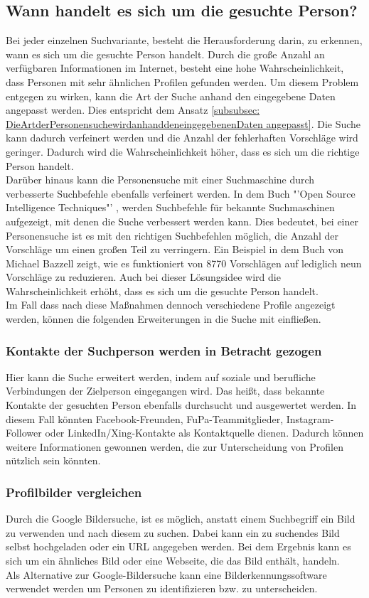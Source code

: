	\subsection{Wann handelt es sich um die gesuchte Person?}
	Bei jeder einzelnen Suchvariante, besteht die Herausforderung darin, zu erkennen, wann es sich um die gesuchte Person handelt. Durch die große Anzahl an verfügbaren Informationen im Internet, besteht eine hohe Wahrscheinlichkeit, dass Personen mit sehr ähnlichen Profilen gefunden werden. Um diesem Problem entgegen zu wirken, kann die Art der Suche anhand den eingegebene Daten angepasst werden. Dies entspricht dem Ansatz \ref{subsubsec: DieArtderPersonensuchewirdanhanddeneingegebenenDaten angepasst}. Die Suche kann dadurch verfeinert werden und die Anzahl der fehlerhaften Vorschläge wird geringer. Dadurch wird die Wahrscheinlichkeit höher, dass es sich um die richtige Person handelt.\\
	Darüber hinaus kann die Personensuche mit einer Suchmaschine durch verbesserte Suchbefehle ebenfalls verfeinert werden. In dem Buch "'Open Source Intelligence Techniques"' \cite{Bazzell}, werden Suchbefehle für bekannte Suchmaschinen aufgezeigt, mit denen die Suche verbessert werden kann. Dies bedeutet, bei einer Personensuche ist es mit den richtigen Suchbefehlen möglich, die Anzahl der Vorschläge um einen großen Teil zu verringern. Ein Beispiel in dem Buch von Michael Bazzell zeigt, wie es funktioniert von 8770 Vorschlägen auf lediglich neun Vorschläge zu reduzieren. \cite{Bazzell}Auch bei dieser Lösungsidee wird die Wahrscheinlichkeit erhöht, dass es sich um die gesuchte Person handelt.\\ Im Fall dass nach diese Maßnahmen dennoch verschiedene Profile angezeigt werden, können die folgenden Erweiterungen in die Suche mit einfließen.
	\subsubsection{Kontakte der Suchperson werden in Betracht gezogen}	
		Hier kann die Suche erweitert werden, indem auf soziale und berufliche Verbindungen der Zielperson eingegangen wird. Das heißt, dass bekannte Kontakte der gesuchten Person ebenfalls durchsucht und ausgewertet werden. In diesem Fall könnten Facebook-Freunden, FuPa-Teammitglieder, Instagram-Follower oder LinkedIn/Xing-Kontakte als Kontaktquelle dienen. Dadurch können weitere Informationen gewonnen werden, die zur Unterscheidung von Profilen nützlich sein könnten.
		\subsubsection{Profilbilder vergleichen}
		Durch die Google Bildersuche, ist es möglich, anstatt einem Suchbegriff ein Bild zu verwenden und nach diesem zu suchen. Dabei kann ein zu suchendes Bild selbst hochgeladen oder ein URL angegeben werden. Bei dem Ergebnis kann es sich um ein ähnliches Bild oder eine Webseite, die das Bild enthält, handeln.\\
		Als Alternative zur Google-Bildersuche kann eine Bilderkennungssoftware verwendet werden um Personen zu identifizieren bzw. zu unterscheiden. %
